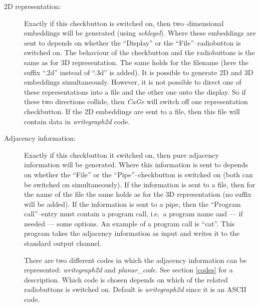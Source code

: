 \documentclass[a4paper]{article}
\def\CaGe{\textit{CaGe}}
\begin{document}
\begin{description}
\item[2D representation:] Exactly if this checkbutton is switched on, then
 two--dimensional embeddings will be generated (using \textit{schlegel}).
 Where these embeddings are sent to depends on whether the ``Display'' or the
 ``File''--radiobutton is switched on. The behaviour of the checkbutton and the
 radiobuttons is the same as for 3D representation. The same holds for the
 filename (here the suffix ``.2d'' instead of ``.3d'' is added).
 It is possible to generate 2D and 3D embeddings simultaneously. However, it is
 not possible to direct one of these representations into a file and the other
 one onto the display. So if these two directions collide, then \CaGe{} will
 switch off one representation checkbutton. If the 2D embeddings are sent to
 a file, then this file will contain data in \textit{writegraph2d} code.
\item[Adjacency information:] Exactly if this checkbutton it switched on, then
 pure adjacency information will be generated. Where this information is sent
 to depends on whether the ``File'' or the ``Pipe''--checkbutton is 
 switched on (both can be switched on simultaneously). If the information is
 sent to a file, then for the name of the
 file the same holds as for the 3D representation (no suffix will be added).
 If the information is sent to a pipe, then the ``Program call''--entry must
 contain a program call, i.e.~a program name and --- if needed --- some 
 options. An example of a program call is ``cat''. This program takes the 
 adjacency information as input and writes it to the standard output channel.
 
 There are two different codes in which the adjacency information can be
 represented: \textit{writegraph2d} and \textit{planar\_code}. See section
 \ref{codes} for a description. Which code is chosen depends on which of the
 related radiobuttons is switched on. Default is \textit{writegraph2d}
 since it is an ASCII code.
\end{description}
\end{document}
